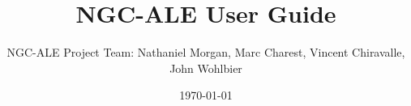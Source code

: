 
\title{NGC-ALE User Guide}
\date{\today}
\author{NGC-ALE Project Team: Nathaniel Morgan, Marc Charest, Vincent Chiravalle, John Wohlbier}

